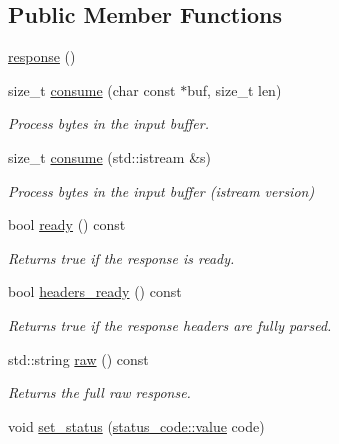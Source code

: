 \subsection*{Public Member Functions}
\begin{DoxyCompactItemize}
\item 
\hyperlink{classwebsocketpp_1_1http_1_1parser_1_1response_a92cd45d36bedf8eb5ec14590f1538d5c}{response} ()
\item 
size\+\_\+t \hyperlink{classwebsocketpp_1_1http_1_1parser_1_1response_ae99b8f1287898b74d1963b95347ab838}{consume} (char const $\ast$buf, size\+\_\+t len)
\begin{DoxyCompactList}\small\item\em Process bytes in the input buffer. \end{DoxyCompactList}\item 
size\+\_\+t \hyperlink{classwebsocketpp_1_1http_1_1parser_1_1response_a5b274a9e5766e679f0939a7e1ecbad56}{consume} (std\+::istream \&s)
\begin{DoxyCompactList}\small\item\em Process bytes in the input buffer (istream version) \end{DoxyCompactList}\item 
bool \hyperlink{classwebsocketpp_1_1http_1_1parser_1_1response_a2514419dcd5e2f9502f69abd4684d9c1}{ready} () const 
\begin{DoxyCompactList}\small\item\em Returns true if the response is ready. \end{DoxyCompactList}\item 
bool \hyperlink{classwebsocketpp_1_1http_1_1parser_1_1response_a57ad878253ad7f833a82cf8a1e28ae9d}{headers\+\_\+ready} () const 
\begin{DoxyCompactList}\small\item\em Returns true if the response headers are fully parsed. \end{DoxyCompactList}\item 
std\+::string \hyperlink{classwebsocketpp_1_1http_1_1parser_1_1response_aa635f976af465ca3fc82f32b5d781fa0}{raw} () const 
\begin{DoxyCompactList}\small\item\em Returns the full raw response. \end{DoxyCompactList}\item 
void \hyperlink{classwebsocketpp_1_1http_1_1parser_1_1response_a2576fc301cc6798d5a830298188b4832}{set\+\_\+status} (\hyperlink{namespacewebsocketpp_1_1http_1_1status__code_ae0d61c309e053ee5673517b54e2886c6}{status\+\_\+code\+::value} code)

\end{DoxyCompactItemize}
